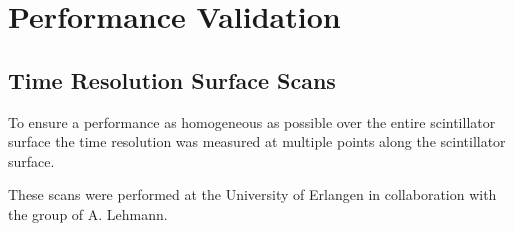 \documentclass[../BTOF_summary.tex]{subfiles}
\begin{document}
\section{Performance Validation}

\subsection{Time Resolution Surface Scans}

To ensure a performance as homogeneous as possible over the entire scintillator surface the time resolution was measured at multiple points along the scintillator surface.

These scans were performed at the University of Erlangen in collaboration with the group of A. Lehmann.
\end{document}

